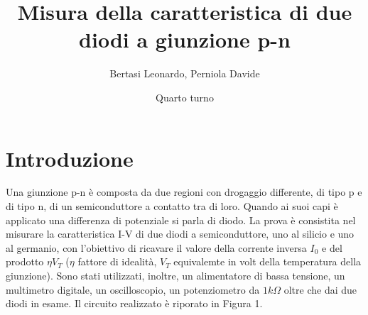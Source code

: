 \documentclass{article}
\title{Misura della caratteristica di due diodi a giunzione p-n}
\date{Quarto turno}
\author{Bertasi Leonardo, Perniola Davide }
\begin{document}
\maketitle
\section{Introduzione} 
Una giunzione p-n è composta da due regioni con drogaggio differente, di tipo p e di tipo n, di un semiconduttore a contatto tra di loro. Quando ai suoi capi è applicato una differenza di potenziale si parla di diodo. 
La prova è consistita nel misurare la caratteristica I-V di due diodi a semiconduttore, uno al silicio e uno al germanio, con l'obiettivo di ricavare il valore della corrente inversa $I_0$ e del prodotto $\eta V_T$ ($\eta$ fattore di idealità, $V_T$ equivalemte in volt della temperatura della giunzione).
Sono stati utilizzati, inoltre, un alimentatore di bassa tensione, un multimetro digitale, un oscilloscopio, un potenziometro da $1k\Omega$ oltre che dai due diodi in esame.
Il circuito realizzato è riporato in Figura 1.
\end{document}
